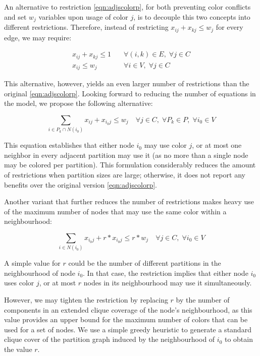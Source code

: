 An alternative to restriction \ref{eqn:adjscolorp}, for both preventing color conflicts and set $w_j$ variables upon usage of color $j$, is to decouple this two concepts into different restrictions. Therefore, instead of restricting $x_{ij} + x_{kj} \leq w_j$ for every edge, we may require:

\begin{align}
x_{ij} + x_{kj} \leq 1 \quad &\forall (i,k) \in E, \; \forall j \in C \label{eqn:adjscolorpone}\\
x_{ij} \leq w_{j} \quad &\forall i \in V, \; \forall j \in C \label{eqn:nodelessthanwj}
\end{align}

This alternative, however, yields an even larger number of restrictions than the original \ref{eqn:adjscolorp}. Looking forward to reducing the number of equations in the model, we propose the following alternative:

\begin{equation}
\label{eqn:adjsperpart}
\sum_{i \in P_k \cap N(i_0)} x_{ij} + x_{i_0j} \leq w_j \quad \forall j \in C, \; \forall P_k \in P, \; \forall i_0 \in V 
\end{equation}

This equation establishes that either node $i_0$ may use color $j$, or at most one neighbor in every adjacent partition may use it (as no more than a single node may be colored per partition). This formulation considerably reduces the amount of restrictions when partition sizes are large; otherwise, it does not report any benefits over the original version \ref{eqn:adjscolorp}.

Another variant that further reduces the number of restrictions makes heavy use of the maximum number of nodes that may use the same color within a neighbourhood:

\begin{equation}
\label{eqn:adjsneighb}
\sum_{i \in N(i_0)} x_{i_0j} + r * x_{i_0j} \leq r * w_j \quad \forall j \in C, \; \forall i_0 \in V 
\end{equation}

A simple value for $r$ could be the number of different partitions in the neighbourhood of node $i_0$. In that case, the restriction implies that either node $i_0$ uses color $j$, or at most $r$ nodes in its neighbourhood may use it simultaneously.

However, we may tighten the restriction by replacing $r$ by the number of components in an extended clique coverage of the node's neighbourhood, as this value provides an upper bound for the maximum number of colors that can be used for a set of nodes. We use a simple greedy heuristic to generate a standard clique cover of the partition graph induced by the neighbourhood of $i_0$ to obtain the value $r$.

